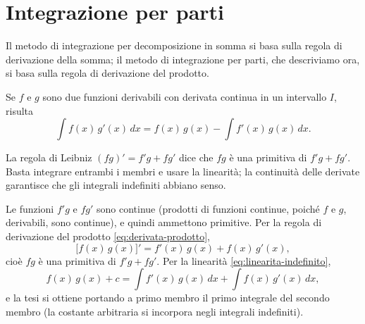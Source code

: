 \section{Integrazione per parti}
\label{sec:per-parti}

Il metodo di integrazione per decomposizione in somma si basa sulla regola di
derivazione della somma; il metodo di integrazione per parti, che descriviamo ora, si
basa sulla regola di derivazione del prodotto.

\begin{teorema}\label{teo:per-parti}
Se $f$ e $g$ sono due funzioni derivabili con derivata continua in un intervallo $I$,
risulta
\begin{equation}\label{eq:per-parti}
  \int f(x)\,g'(x)\,dx=f(x)\,g(x)-\int f'(x)\,g(x)\,dx .
\end{equation}
\end{teorema}

\begin{schema}
\end{schema}

\begin{strategia}
La regola di Leibniz $(fg)'=f'g+fg'$ dice che $fg$ è una primitiva di $f'g+fg'$. Basta
integrare entrambi i membri e usare la linearità; la continuità delle derivate garantisce
che gli integrali indefiniti abbiano senso.
\end{strategia}

\begin{dimostrazione}
Le funzioni $f'g$ e $fg'$ sono continue (prodotti di funzioni continue, poiché $f$ e $g$,
derivabili, sono continue), e quindi ammettono primitive. Per la regola di derivazione
del prodotto \eqref{eq:derivata-prodotto},
\[
  \bigl[f(x)\,g(x)\bigr]'=f'(x)\,g(x)+f(x)\,g'(x) ,
\]
cioè $fg$ è una primitiva di $f'g+fg'$. Per la linearità \eqref{eq:linearita-indefinito},
\[
  f(x)\,g(x)+c=\int f'(x)\,g(x)\,dx+\int f(x)\,g'(x)\,dx ,
\]
e la tesi si ottiene portando a primo membro il primo integrale del secondo membro (la
costante arbitraria si incorpora negli integrali indefiniti).
\end{dimostrazione}


